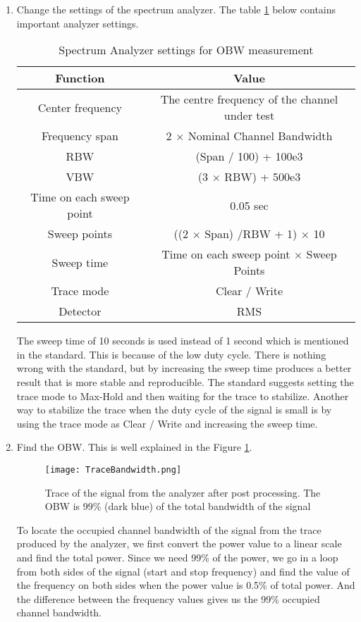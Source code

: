 \begin{enumerate}
\item Change the settings of the spectrum analyzer. The table \ref{tab:analyzer} below contains important analyzer settings.
\begin{table}[H]
\begin{center}
\begin {tabular} {|c|c|} 
\toprule
Function & Value \\ 
\midrule 
Center frequency & The centre frequency of the channel under test \\
Frequency span &2 $\times$ Nominal Channel Bandwidth \\
\ac{RBW} & (Span / 100) + 100e3 \\
\ac{VBW} & (3 $\times$ RBW) + 500e3\\
Time on each sweep point & 0.05 sec\\
Sweep points & ((2 $\times$ Span) /RBW + 1) $\times$ 10\\
Sweep time & Time on each sweep point $\times$ Sweep Points \\
Trace mode & Clear / Write\\
Detector & \ac{RMS}\\
\bottomrule
\end{tabular} 
\caption{Spectrum Analyzer settings for \ac{OBW} measurement}
\label{tab:analyzer}
\end{center}
\end{table}
The sweep time of 10 seconds is used instead of 1 second which is mentioned in the standard. This is because of the low duty cycle. There is nothing wrong with the standard, but by increasing the sweep time produces a better result that is more stable and reproducible. The standard suggests setting the trace mode to Max-Hold and then waiting for the trace to stabilize. Another way to stabilize the trace when the duty cycle of the signal is small is by using the trace mode as Clear / Write and increasing the sweep time.

\item Find the \ac{OBW}. This is well explained in the Figure \ref{fig:tracebw}.
\begin{figure}[H]
\centering
\texttt{[image: TraceBandwidth.png]}
\caption{Trace of the signal from the analyzer after post processing. The \acs{OBW} is 99\% (dark blue) of the total bandwidth of the signal}
\label{fig:tracebw}
\end{figure}
To locate the occupied channel bandwidth of the signal from the trace produced by the analyzer, we first convert the power value to a linear scale and find the total power. Since we need 99\% of the power, we go in a loop from both sides of the signal (start and stop frequency) and find the value of the frequency on both sides when the power value is 0.5\% of total power. And the difference between the frequency values gives us the 99\% occupied channel bandwidth.
\end{enumerate}
  
